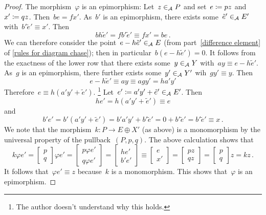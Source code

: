 \begin{proof}
  The morphism~$\varphi$ is an epimorphism:
  Let~$z \in_{\mathcal{A}} P$ and set~$e \coloneqq p z$ and~$x' \coloneqq q z$.
  Then~$b e = f x'$.
  As~$b'$ is an epimorphism, there exists some~$\tilde{e}' \in_{\mathcal{A}} E'$ with~$b' \tilde{e}' \equiv x'$.
  Then
  \[
    b h \tilde{e}'
    =
    f b' \tilde{e}'
    \equiv
    f x'
    =
    b e \,.
  \]
  We can therefore consider the point~$e - h \tilde{e}' \in_{\mathcal{A}} E$ (from part~\ref*{difference element} of \cref{rules for diagram chase});
  then in particular~$b(e - h \tilde{e}') = 0$.
  It follows from the exactness of the lower row that there exists some~$y \in_{\mathcal{A}} Y$ with~$a y \equiv e - h \tilde{e}'$.
  As~$g$ is an epimorphism, there further exists some~$y' \in_{\mathcal{A}} Y'$ wih~$g y' \equiv y$.
  Then
  \[
    e - h \tilde{e}'
    \equiv
    a y
    \equiv
    a g y'
    =
    h a' y'
  \]
  Therefore~$e \equiv h (a' y' + \tilde{e}')$.%
  \footnote{The author doesn’t understand why this holds.}
  Let~$e' \coloneqq a' y' + \tilde{e}' \in_{\mathcal{A}} E'$.
  Then
  \[
    h e'
    =
    h (a' y' + \tilde{e}')
    \equiv
    e
  \]
  and
  \[
    b' e'
    =
    b' (a' y' + \tilde{e}')
    =
    b' a' y' + b' \tilde{e}'
    =
    0 + b' \tilde{e}'
    =
    b' \tilde{e}'
    \equiv
    x \,.
  \]
  We note that the morphism~$k \colon P \to E \oplus X'$ (as above) is a monomorphism by the universal property of the pullback~$(P,p,q)$.
  The above calculation shows that
  \[
    k \varphi e'
    =
    \begin{bmatrix}
      p \\
      q
    \end{bmatrix}
    \varphi e'
    =
    \begin{bmatrix}
      p \varphi e'  \\
      q \varphi e'
    \end{bmatrix}
    =
    \begin{bmatrix}
      h e'  \\
      b' e'
    \end{bmatrix}
    \equiv
    \begin{bmatrix}
      e \\
      x'
    \end{bmatrix}
    =
    \begin{bmatrix}
      p z \\
      q z
    \end{bmatrix}
    =
    \begin{bmatrix}
      p \\
      q
    \end{bmatrix}
    z
    =
    k z \,.
  \]
  It follows that~$\varphi e' \equiv z$ because~$k$ is a monomorphism.
  This shows that~$\varphi$ is an epimorphism.
\end{proof}


